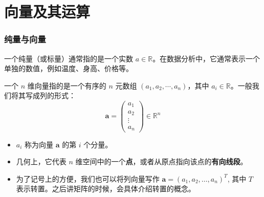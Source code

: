 
\section{向量及其运算}


\begin{frame}
\frametitle{纯量与向量}

\begin{Def}[纯量 (Scalar)]
一个纯量（或标量）通常指的是一个实数 $a \in \mathbb{R}$。在数据分析中，它通常表示一个单独的数值，例如温度、身高、价格等。
\end{Def}

\pause

\begin{Def}[向量 (Vector)]
一个 $n$ 维向量指的是一个有序的 $n$ 元数组 $(a_1, a_2, \cdots, a_n)$，其中 $a_i \in \mathbb{R}$。一般我们将其写成列的形式：
\[
\mathbf{a} = \begin{pmatrix}
a_1 \\ a_2 \\ \vdots \\ a_n
\end{pmatrix} \in \mathbb{R}^n
\]
\begin{itemize}
    \item $a_i$ 称为向量 $\mathbf{a}$ 的第 $i$ 个分量。
    \item 几何上，它代表 $n$ 维空间中的一个\textbf{点}，或者从原点指向该点的\textbf{有向线段}。
    \item 为了记号上的方便，我们也可以将列向量写作 $\mathbf{a} = (a_1, a_2, \dots, a_n)^T$, 其中 $T$ 表示转置。之后讲矩阵的时候，会具体介绍转置的概念。
\end{itemize}
\end{Def}

\end{frame}


